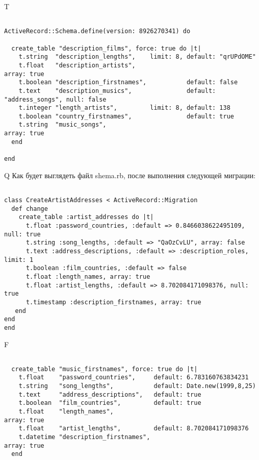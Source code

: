 T
\begin{verbatim}

ActiveRecord::Schema.define(version: 8926270341) do

  create_table "description_films", force: true do |t|
    t.string  "description_lengths",    limit: 8, default: "qrUPdOME"
    t.float   "description_artists",                                                     array: true
    t.boolean "description_firstnames",           default: false
    t.text    "description_musics",               default: "address_songs", null: false
    t.integer "length_artists",         limit: 8, default: 138
    t.boolean "country_firstnames",               default: true
    t.string  "music_songs",                                                             array: true
  end

end
\end{verbatim}

Q
Как будет выглядеть файл shema.rb, после выполнения следующей миграции:

\begin{verbatim}

class CreateArtistAddresses < ActiveRecord::Migration 
  def change 
    create_table :artist_addresses do |t| 
      t.float :password_countries, :default => 0.8466038622495109, null: true
      t.string :song_lengths, :default => "QaOzCvLU", array: false
      t.text :address_descriptions, :default => :description_roles, limit: 1
      t.boolean :film_countries, :default => false
      t.float :length_names, array: true
      t.float :artist_lengths, :default => 8.702084171098376, null: true
      t.timestamp :description_firstnames, array: true
   end
end
end
\end{verbatim}

F
\begin{verbatim}

  create_table "music_firstnames", force: true do |t|
    t.float    "password_countries",     default: 6.783160763834231
    t.string   "song_lengths",           default: Date.new(1999,8,25)
    t.text     "address_descriptions",   default: true
    t.boolean  "film_countries",         default: true
    t.float    "length_names",                                         array: true
    t.float    "artist_lengths",         default: 8.702084171098376
    t.datetime "description_firstnames",                               array: true
  end

\end{verbatim}

